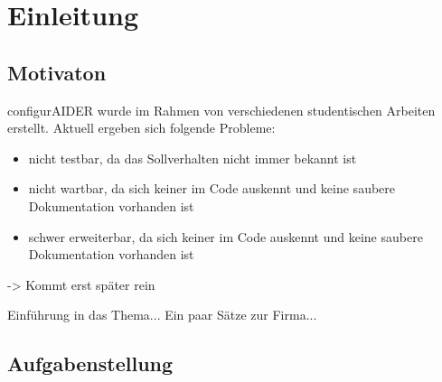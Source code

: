 \chapter{Einleitung}

\section{Motivaton}

\textcolor[rgb]{1,0,0}{configurAIDER wurde im Rahmen von verschiedenen studentischen Arbeiten erstellt. Aktuell ergeben sich folgende Probleme:
\begin{itemize}
	\item nicht testbar, da das Sollverhalten nicht immer bekannt ist
	\item nicht wartbar, da sich keiner im Code auskennt und keine saubere Dokumentation vorhanden ist
	\item schwer erweiterbar, da sich keiner im Code auskennt und keine saubere Dokumentation vorhanden ist
\end{itemize}
}
-> Kommt erst später rein

Einführung in das Thema...
Ein paar Sätze zur Firma...


\section{Aufgabenstellung}	

